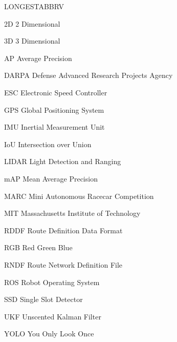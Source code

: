 \begin{theglossary}{LONGESTABBRV}
\item[2D] 2 Dimensional
\item[3D] 3 Dimensional
\item[AP] Average Precision
\item[DARPA] Defense Advanced Research Projects Agency
\item[ESC] Electronic Speed Controller
\item[GPS] Global Positioning System
\item[IMU] Inertial Measurement Unit
\item[IoU] Intersection over Union
\item[LIDAR] Light Detection and Ranging
\item[mAP] Mean Average Precision
\item[MARC] Mini Autonomous Racecar Competition
\item[MIT] Massachusetts Institute of Technology
\item[RDDF] Route Definition Data Format
\item[RGB] Red Green Blue
\item[RNDF] Route Network Definition File
\item[ROS] Robot Operating System
\item[SSD] Single Slot Detector
\item[UKF] Unscented Kalman Filter
\item[YOLO] You Only Look Once
\end{theglossary}
